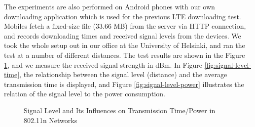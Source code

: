 \documentclass[english]{tktltiki}
\begin{document}
The experiments are also performed on Android phones with our own downloading application which is used for the previous LTE downloading test. Mobiles fetch a fixed-size file (33.66 MB) from the server via HTTP connection, and records downloading times and received signal levels from the devices. We took the whole setup out in our office at the University of Helsinki, and ran the test at a number of different distances. The test results are shown in the Figure \ref{fig:signal-level}, and we measure the received signal strength in dBm. In Figure \ref{fig:signal-level-time}, the relationship between the signal level (distance) and the average transmission time is displayed, and Figure \ref{fig:signal-level-power} illustrates the relation of the signal level to the power consumption. 

\begin{figure}[htbp]
  \centering
  \hspace{5pt}%
  \caption{Signal Level and Its Influences on Transmission Time/Power in 802.11n Networks}
  \label{fig:signal-level}
\end{figure}
\end{document}
